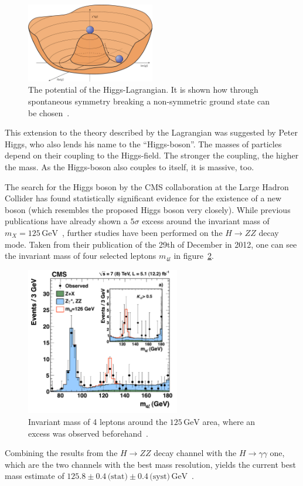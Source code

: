 \begin{figure}[ht!]
  \centering
    \includegraphics[width=0.5\textwidth]{plots/higgspotential.jpg}
  \caption{The potential of the Higgs-Lagrangian. It is shown how through spontaneous symmetry breaking a non-symmetric ground state can be chosen~\cite{higgspotential}.}
  \label{fig:higgspotential}
\end{figure}


This extension to the theory described by the Lagrangian was suggested by Peter Higgs, who also lends his name to the ``Higgs-boson''. The masses of particles depend on their coupling to the Higgs-field. The stronger the coupling, the higher the mass. As the Higgs-boson also couples to itself, it is massive, too.

The search for the Higgs boson by the CMS collaboration at the Large Hadron Collider has found statistically significant evidence for the existence of a new boson (which resembles the proposed Higgs boson very closely). While previous publications have already shown a $5 \sigma$ excess around the invariant mass of $m_X = 125\,\text{GeV}$~\cite{higgscls}, further studies have been performed on the $H \rightarrow ZZ$ decay mode. Taken from their publication of the 29th of December in 2012, one can see the invariant mass of four selected leptons $m_{4 l}$ in figure~\ref{fig:higgsmzz}.

\begin{figure}[ht!]
  \centering
    \includegraphics[width=0.6\textwidth]{plots/higgsmzz.pdf}
  \caption{Invariant mass of 4 leptons around the $125\,\text{GeV}$ area, where an excess was observed beforehand~\cite{higgsmzz}.}
  \label{fig:higgsmzz}
\end{figure}

\noindent Combining the results from the $H \rightarrow ZZ$ decay channel with the $H \rightarrow \gamma \gamma$ one, which are the two channels with the best mass resolution, yields the current best mass estimate of $125.8 \pm 0.4 \,\text{(stat)} \pm 0.4\,\text{(syst)}\,\text{GeV}$~\cite{higgsmzz}.


